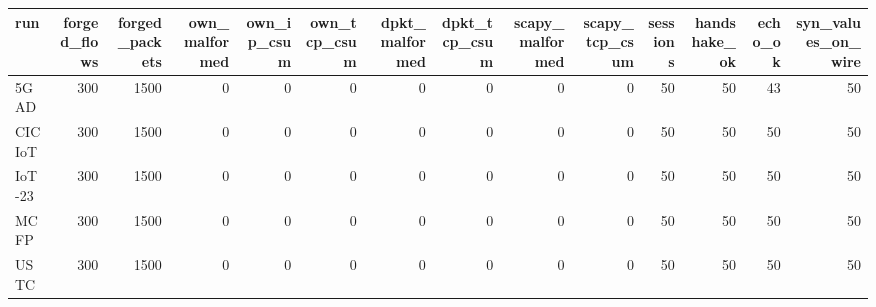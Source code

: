 \begin{tabular}{lrrrrrrrrrrrrr}
\toprule
run & forged\_flows & forged\_packets & own\_malformed & own\_ip\_csum & own\_tcp\_csum & dpkt\_malformed & dpkt\_tcp\_csum & scapy\_malformed & scapy\_tcp\_csum & sessions & handshake\_ok & echo\_ok & syn\_values\_on\_wire \\
\midrule
5GAD & 300 & 1500 & 0 & 0 & 0 & 0 & 0 & 0 & 0 & 50 & 50 & 43 & 50 \\
CICIoT & 300 & 1500 & 0 & 0 & 0 & 0 & 0 & 0 & 0 & 50 & 50 & 50 & 50 \\
IoT-23 & 300 & 1500 & 0 & 0 & 0 & 0 & 0 & 0 & 0 & 50 & 50 & 50 & 50 \\
MCFP & 300 & 1500 & 0 & 0 & 0 & 0 & 0 & 0 & 0 & 50 & 50 & 50 & 50 \\
USTC & 300 & 1500 & 0 & 0 & 0 & 0 & 0 & 0 & 0 & 50 & 50 & 50 & 50 \\
\bottomrule
\end{tabular}
